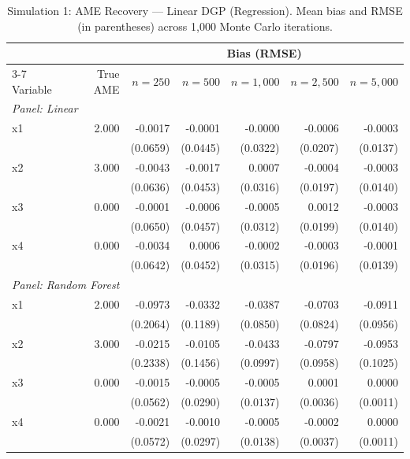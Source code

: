 \documentclass[12pt]{article}
\begin{document}
	\begin{table}[htbp]
		\centering
		\small
		\begin{threeparttable}
			\caption{Simulation 1: AME Recovery --- Linear DGP (Regression). Mean bias and RMSE (in parentheses) across 1,000 Monte Carlo iterations.}
			\label{tab:sim1_regression_linear}
			\begin{tabular}{lrrrrrr}
				\toprule
				& & \multicolumn{5}{c}{Bias (RMSE)} \\
				\cmidrule(lr){3-7}
				Variable & True AME & $n=250$ & $n=500$ & $n=1,000$ & $n=2,500$ & $n=5,000$ \\
				\midrule
				\multicolumn{7}{l}{\textit{Panel: Linear}} \\
				\quad x1 & 2.000 & -0.0017 & -0.0001 & -0.0000 & -0.0006 & -0.0003 \\
				&  & (0.0659) & (0.0445) & (0.0322) & (0.0207) & (0.0137) \\
				\quad x2 & 3.000 & -0.0043 & -0.0017 & 0.0007 & -0.0004 & -0.0003 \\
				&  & (0.0636) & (0.0453) & (0.0316) & (0.0197) & (0.0140) \\
				\quad x3 & 0.000 & -0.0001 & -0.0006 & -0.0005 & 0.0012 & -0.0003 \\
				&  & (0.0650) & (0.0457) & (0.0312) & (0.0199) & (0.0140) \\
				\quad x4 & 0.000 & -0.0034 & 0.0006 & -0.0002 & -0.0003 & -0.0001 \\
				&  & (0.0642) & (0.0452) & (0.0315) & (0.0196) & (0.0139) \\
				\midrule
				\multicolumn{7}{l}{\textit{Panel: Random Forest}} \\
				\quad x1 & 2.000 & -0.0973 & -0.0332 & -0.0387 & -0.0703 & -0.0911 \\
				&  & (0.2064) & (0.1189) & (0.0850) & (0.0824) & (0.0956) \\
				\quad x2 & 3.000 & -0.0215 & -0.0105 & -0.0433 & -0.0797 & -0.0953 \\
				&  & (0.2338) & (0.1456) & (0.0997) & (0.0958) & (0.1025) \\
				\quad x3 & 0.000 & -0.0015 & -0.0005 & -0.0005 & 0.0001 & 0.0000 \\
				&  & (0.0562) & (0.0290) & (0.0137) & (0.0036) & (0.0011) \\
				\quad x4 & 0.000 & -0.0021 & -0.0010 & -0.0005 & -0.0002 & 0.0000 \\
				&  & (0.0572) & (0.0297) & (0.0138) & (0.0037) & (0.0011) \\
				\midrule

\end{tabular}
\end{threeparttable}
\end{table}
\end{document}
